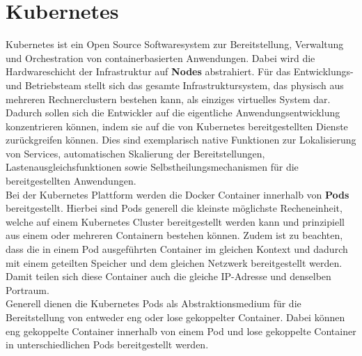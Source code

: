 \section{Kubernetes}
\label{Kubernetes}
Kubernetes ist ein Open Source Softwaresystem zur Bereitstellung, Verwaltung und Orchestration von containerbasierten Anwendungen. Dabei wird die Hardwareschicht der Infrastruktur auf \textbf{Nodes} abstrahiert. Für das Entwicklungs- und Betriebsteam stellt sich das gesamte Infrastruktursystem, das physisch aus mehreren Rechnerclustern bestehen kann, als einziges virtuelles System dar. Dadurch sollen sich die Entwickler auf die eigentliche Anwendungsentwicklung konzentrieren können, indem sie auf die von Kubernetes bereitgestellten Dienste zurückgreifen können. Dies sind exemplarisch native Funktionen zur Lokalisierung von Services, automatischen Skalierung der Bereitstellungen, Lastenausgleichsfunktionen sowie Selbstheilungsmechanismen für die bereitgestellten Anwendungen.\autocite[Vgl.][S. 19-21]{Luksa.2018}\\
Bei der Kubernetes Plattform werden die Docker Container innerhalb von \textbf{Pods} bereitgestellt. Hierbei sind Pods generell die kleinste möglichste Recheneinheit, welche auf einem Kubernetes Cluster bereitgestellt werden kann und prinzipiell aus einem oder mehreren Containern bestehen können.
Zudem ist zu beachten, dass die in einem Pod ausgeführten Container im gleichen Kontext und dadurch mit einem geteilten Speicher und dem gleichen Netzwerk bereitgestellt werden. Damit teilen sich diese Container auch die gleiche \ac{IP}-Adresse und denselben Portraum.\\
Generell dienen die Kubernetes Pods als Abstraktionsmedium für die Bereitstellung von entweder eng oder lose gekoppelter Container. Dabei können eng gekoppelte Container innerhalb von einem Pod und lose gekoppelte Container in unterschiedlichen Pods bereitgestellt werden.\autocite[Vgl.][What is a Pod, Motivation for Pods]{KubernetesAuthors.20190806}
